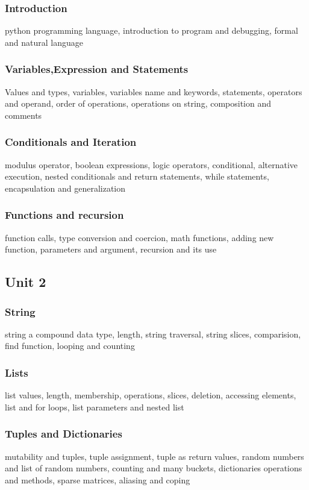 \documentclass[twocolumn]{article}
\begin{document}
    \subsubsection*{Introduction}
    python programming language, introduction to program and debugging, formal and natural language
    \subsubsection*{Variables,Expression and Statements}
    Values and types, variables, variables name and keywords, statements, operators and operand, order of operations, operations on string, composition and comments
    \subsubsection*{Conditionals and Iteration}
    modulus operator, boolean expressions, logic operators, conditional, 
    alternative execution, nested conditionals and return statements, while statements, encapsulation and generalization
    \subsubsection*{Functions and recursion}
    function calls, type conversion and coercion, math functions, adding new function, parameters and argument, recursion and its use
    \subsection*{Unit 2}
    \subsubsection*{String}
    string a compound data type, length, string traversal, string slices, comparision, find function, looping and counting
    \subsubsection*{Lists}
    list values, length, membership, operations, slices, deletion, accessing elements, list and for loops, list parameters and nested list
    \subsubsection*{Tuples and Dictionaries}
    mutability and tuples, tuple assignment, tuple as return values, random numbers and list of random numbers, counting and many buckets, dictionaries operations and methods, sparse matrices, aliasing and coping
\end{document}
